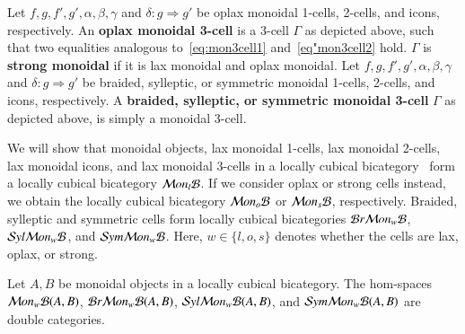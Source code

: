 \begin{defn}
  Let $f,g,f',g', \alpha, \beta, \gamma$ and $\delta: g \Rightarrow g'$ be oplax monoidal 1-cells, 2-cells, and icons, respectively. An \textbf{oplax monoidal 3-cell} is a 3-cell  $\Gamma$ as depicted above, such that two equalities analogous to~\ref{eq:mon3cell1} and~\ref{eq"mon3cell2} hold. $\Gamma$ is {\bf strong monoidal} if it is lax monoidal and oplax monoidal.
Let $f,g,f',g', \alpha, \beta, \gamma$ and $\delta: g \Rightarrow g'$ be braided, sylleptic, or symmetric monoidal 1-cells, 2-cells, and icons, respectively. A \textbf{braided, sylleptic, or symmetric monoidal 3-cell} $\Gamma$ as depicted above, is simply a monoidal 3-cell. 
\end{defn}

We will show that monoidal objects, lax monoidal 1-cells, lax monoidal 2-cells, lax monoidal icons, and lax monoidal 3-cells in a locally cubical bicategory \fB\ form a locally cubical bicategory $\mathcal{M} on_l\mathcal{B}$. If we consider oplax or strong cells instead, we obtain the locally cubical bicategory $\mathcal{M} on_o\mathcal{B}$ or $\mathcal{M} on_s\mathcal{B}$, respectively. Braided, sylleptic and symmetric cells form  locally cubical bicategories $\mathcal{B} r \mathcal{M} on_w\mathcal{B}$, $\mathcal{S} yl \mathcal{M} on_w\mathcal{B}$, and $\mathcal{S} ym \mathcal{M} on_w\mathcal{B}$. Here, $w \in \{l,o,s\}$ denotes whether the cells are lax, oplax, or strong.

\begin{prop}\label{prop:dc}
Let $A,B$ be monoidal objects in a locally cubical bicategory. The hom-spaces $\mathcal{M} on_w\mathcal{B} (A,B)$, $\mathcal{B} r \mathcal{M} on_w\mathcal{B}(A,B)$, $\mathcal{S} yl \mathcal{M} on_w\mathcal{B}(A,B)$, and $\mathcal{S} ym \mathcal{M} on_w\mathcal{B}(A,B)$ are double categories.
\end{prop}

